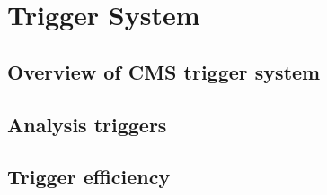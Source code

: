 \chapter{Trigger System}
\label{chap:trigger}

\section{Overview of CMS trigger system}
\label{sec:trigOverview}

\section{Analysis triggers}
\label{sec:trigRequirements}

\section{Trigger efficiency}
\label{sec:trigEff}

